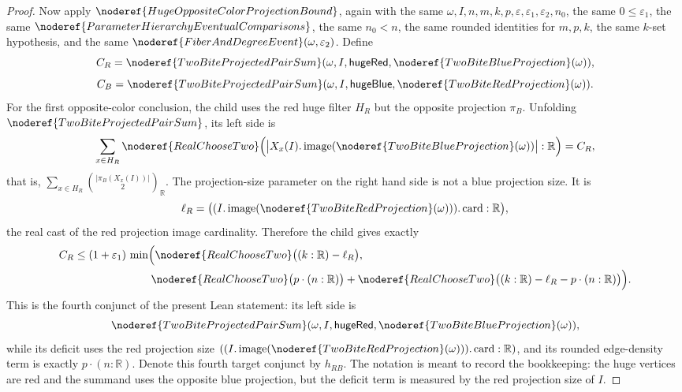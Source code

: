 \begin{proof}
Now apply \(\noderef{HugeOppositeColorProjectionBound}\), again with the same
\(\omega,I,n,m,k,p,\varepsilon,\varepsilon_1,\varepsilon_2,n_0\), the same
\(0\le\varepsilon_1\), the same
\(\noderef{ParameterHierarchyEventualComparisons}\), the same \(n_0<n\), the
same rounded identities for \(m,p,k\), the same \(k\)-set hypothesis, and the
same \(\noderef{FiberAndDegreeEvent}(\omega,\varepsilon_2)\).  Define
\[
C_R=\noderef{TwoBiteProjectedPairSum}
  (\omega,I,\mathsf{hugeRed},\noderef{TwoBiteBlueProjection}(\omega)),
\]
\[
C_B=\noderef{TwoBiteProjectedPairSum}
  (\omega,I,\mathsf{hugeBlue},\noderef{TwoBiteRedProjection}(\omega)).
\]
For the first opposite-color conclusion, the child uses the red huge filter
\(H_R\) but the opposite projection \(\pi_B\).  Unfolding
\(\noderef{TwoBiteProjectedPairSum}\), its left side is
\[
\sum_{x\in H_R}\noderef{RealChooseTwo}
  \Bigl(\bigl|X_x(I).\operatorname{image}
    (\noderef{TwoBiteBlueProjection}(\omega))\bigr|:\mathbb R\Bigr)=C_R,
\]
that is, \(\sum_{x\in H_R}\binom{|\pi_B(X_x(I))|}{2}_{\mathbb R}\).  The
projection-size parameter on the right hand side is not a blue projection
size.  It is
\[
\ell_R=\bigl((I.\operatorname{image}
  (\noderef{TwoBiteRedProjection}(\omega))).\operatorname{card}:\mathbb R\bigr),
\]
the real cast of the red projection image cardinality.  Therefore the child
gives exactly
\[
\begin{aligned}
C_R
&\le
(1+\varepsilon_1)\,
\min\Bigl(
  \noderef{RealChooseTwo}\bigl((k:\mathbb R)-\ell_R\bigr),\\
&\hspace{7em}
  \noderef{RealChooseTwo}\bigl(p\cdot(n:\mathbb R)\bigr)
  +\noderef{RealChooseTwo}
    \bigl((k:\mathbb R)-\ell_R-p\cdot(n:\mathbb R)\bigr)
\Bigr).
\end{aligned}
\]
This is the fourth conjunct of the present Lean statement: its left side is
\[
\noderef{TwoBiteProjectedPairSum}
  (\omega,I,\mathsf{hugeRed},\noderef{TwoBiteBlueProjection}(\omega)),
\]
while its deficit uses the red projection size
\(((I.\operatorname{image}(\noderef{TwoBiteRedProjection}(\omega))).\operatorname{card}:\mathbb R)\),
and its rounded edge-density term is exactly \(p\cdot(n:\mathbb R)\).
Denote this fourth target conjunct by \(h_{RB}\).  The notation is meant to
record the bookkeeping: the huge vertices are red and the summand uses the
opposite blue projection, but the deficit term is measured by the red
projection size of \(I\).


\end{proof}
